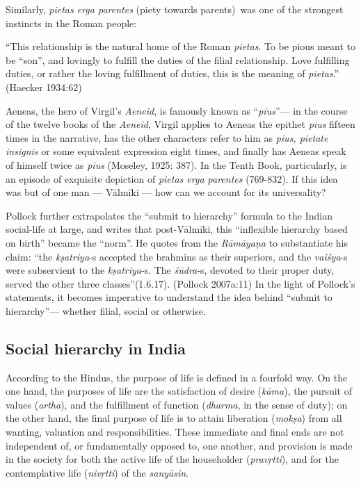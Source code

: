 Similarly, {\sl pietas erga parentes} (piety towards parents) was one of the strongest instincts in the Roman people: 

\begin{myquote}
“This relationship is the natural home of the Roman {\sl pietas}. To be pious meant to be “son”, and lovingly to fulfill the duties of the filial relationship. Love fulfilling duties, or rather the loving fulfillment of duties, this is the meaning of {\sl pietas}.”
\hfill (Haecker 1934:62)
\end{myquote}

\medskip

Aeneas, the hero of Virgil’s {\sl Aeneid}, is famously known as “{\sl pius}”--- in the course of the twelve books of the {\sl Aeneid}, Virgil applies to Aeneas the epithet {\sl pius} fifteen times in the narrative, has the other characters refer to him as {\sl pius, pietate insignis} or some equivalent expression eight times, and finally has Aeneas speak of himself twice as {\sl pius} (Moseley, 1925: 387). In the Tenth Book, particularly, is an episode of exquisite depiction of {\sl pietas erga parentes} (769-832). If this idea was but of one man --- Vālmīki --- how can we account for its universality? 

Pollock further extrapolates the “submit to hierarchy” formula to the Indian social-life at large, and writes that post-Vālmīki, this “inflexible hierarchy based on birth” became the “norm”. He quotes from the {\sl Rāmāyaṇa} to substantiate his claim: “the {\sl kṣatriya}-s accepted the brahmins as their superiors, and the {\sl vaiśya}-s were subservient to the {\sl kṣatriya}-s. The {\sl śūdra}-s, devoted to their proper duty, served the other three classes”(1.6.17). (Pollock 2007a:11) In the light of Pollock’s statements, it becomes imperative to understand the idea behind “submit to hierarchy”— whether filial, social or otherwise. 

\subsection[Social hierarchy in India]{Social hierarchy in India}\label{sec1.3.1}

According to the Hindus, the purpose of life is defined in a fourfold way. On the one hand, the purposes of life are the satisfaction of desire ({\sl kāma}), the pursuit of values ({\sl artha}), and the fulfillment of function ({\sl dharma}, in the sense of duty); on the other hand, the final purpose of life is to attain liberation ({\sl mokṣa}) from all wanting, valuation and responsibilities. These immediate and final ends are not independent of, or fundamentally opposed to, one another, and provision is made in the society for both the active life of the householder ({\sl pravṛtti}), and for the contemplative life ({\sl nivṛtti}) of the {\sl sanyāsin}.  

